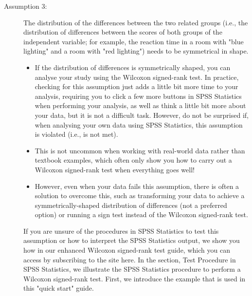 \documentclass[]{article}
\begin{document}
\begin{description}

\item[Assumption 3:] The distribution of the differences between the two related groups (i.e., the distribution of differences between the scores of both groups of the independent variable; for example, the reaction time in a room with "blue lighting" and a room with "red lighting") needs to be symmetrical in shape. 
\begin{itemize}
	\item If the distribution of differences is symmetrically shaped, you can analyse your study using the Wilcoxon signed-rank test. In practice, checking for this assumption just adds a little bit more time to your analysis, requiring you to click a few more buttons in SPSS Statistics when performing your analysis, as well as think a little bit more about your data, but it is not a difficult task. However, do not be surprised if, when analysing your own data using SPSS Statistics, this assumption is violated (i.e., is not met). \item This is not uncommon when working with real-world data rather than textbook examples, which often only show you how to carry out a Wilcoxon signed-rank test when everything goes well! 
	\item However, even when your data fails this assumption, there is often a solution to overcome this, such as transforming your data to achieve a symmetrically-shaped distribution of differences (not a preferred option) or running a sign test instead of the Wilcoxon signed-rank test.
\end{itemize} 

If you are unsure of the procedures in SPSS Statistics to test this assumption or how to interpret the SPSS Statistics output, we show you how in our enhanced Wilcoxon signed-rank test guide, which you can access by subscribing to the site here.
In the section, Test Procedure in SPSS Statistics, we illustrate the SPSS Statistics procedure to perform a Wilcoxon signed-rank test. First, we introduce the example that is used in this "quick start" guide.
\end{description}
\end{document}
